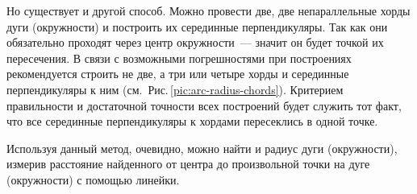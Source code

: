 Но существует и другой способ. Можно провести две, две непараллельные хорды дуги (окружности) и построить их серединные перпендикуляры. Так как они обязательно проходят через центр окружности~--- значит он будет точкой их пересечения. В связи с возможными погрешностями при построениях рекомендуется строить не две, а три или четыре хорды и серединные перпендикуляры к ним (см.~Рис.\,\ref{pic:arc-radius-chords}). Критерием правильности и достаточной точности всех построений будет служить тот факт, что все серединные перпендикуляры к хордами пересеклись в одной точке.

Используя данный метод, очевидно, можно найти и радиус дуги (окружности), измерив расстояние найденного от центра до произвольной точки на дуге (окружности) с помощью линейки.

